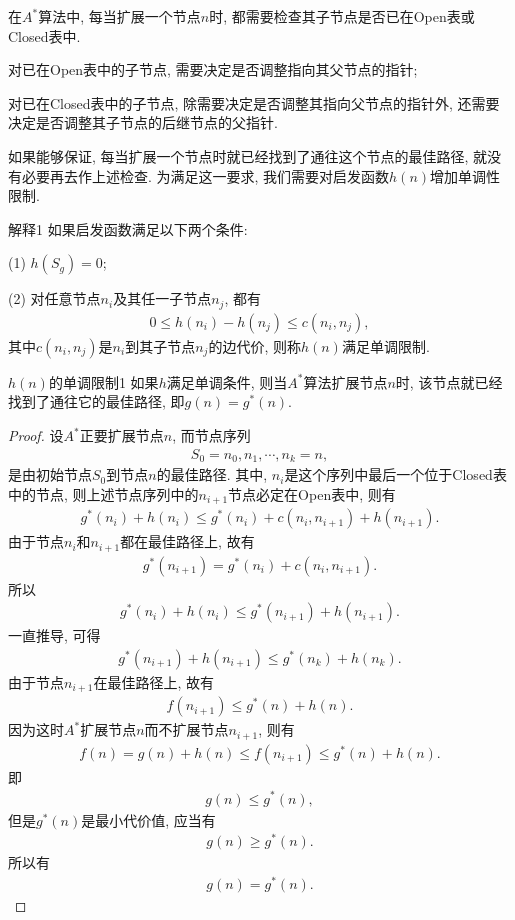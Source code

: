 在$A^*$算法中, 每当扩展一个节点$n$时, 都需要检查其子节点是否已在Open表或Closed表中.

对已在Open表中的子节点, 需要决定是否调整指向其父节点的指针;

对已在Closed表中的子节点, 除需要决定是否调整其指向父节点的指针外, 还需要决定是否调整其子节点的后继节点的父指针.

如果能够保证, 每当扩展一个节点时就已经找到了通往这个节点的最佳路径, 就没有必要再去作上述检查.
为满足这一要求, 我们需要对启发函数$h(n)$增加单调性限制.

\begin{mydef}{解释}{1}
如果启发函数满足以下两个条件:

(1) $h(S_g)=0$;

(2) 对任意节点$n_i$及其任一子节点$n_j$, 都有
\begin{align}
  0\leq h(n_i)-h(n_j)\leq c(n_i, n_j),
\end{align}
其中$c(n_i, n_j)$是$n_i$到其子节点$n_j$的边代价, 则称$h(n)$满足单调限制.
\end{mydef}
\begin{mythm}{$h(n)$的单调限制}{1}
如果$h$满足单调条件, 则当$A^*$算法扩展节点$n$时, 该节点就已经找到了通往它的最佳路径, 即$g(n)=g^*(n)$.
\end{mythm}
\begin{proof}
设$A^*$正要扩展节点$n$, 而节点序列
\begin{align}
  S_0=n_0, n_1,\cdots,n_k=n,
\end{align}
是由初始节点$S_0$到节点$n$的最佳路径. 其中, $n_i$是这个序列中最后一个位于Closed表中的节点, 则上述节点序列中的$n_{i+1}$节点必定在Open表中, 则有
\begin{align}
  g^*(n_i)+h(n_i)\leq g^*(n_i) +c(n_i, n_{i+1}) +h(n_{i+1}).
\end{align}
由于节点$n_i$和$n_{i+1}$都在最佳路径上, 故有
\begin{align}
  g^*( n_{i+1} )=g^*(n_i )+c(n_i, n_{i+1}).
\end{align}
所以
\begin{align}
g^*(n_i )+h(n_i )\leq g^*( n_{i+1}) +h(n_{i+1}).
\end{align}
一直推导, 可得
\begin{align}
  g^*( n_{i+1} )+h(n_{i+1})\leq g^*( n_k) +h(n_k).
\end{align}
由于节点$n_{i+1}$在最佳路径上, 故有
\begin{align}
  f( n_{i+1} )\leq g^*(n) +h(n).
\end{align}
因为这时$A^*$扩展节点$n$而不扩展节点$n_{i+1}$, 则有
\begin{align}
  f(n)=g(n)+h(n)\leq f( n_{i+1} )\leq g^*(n)+h(n).
\end{align}
即
\begin{align}
  g(n)\leq g^*(n),
\end{align}
但是$g^*(n)$是最小代价值, 应当有
\begin{align}
  g(n)\geq g^*(n).
\end{align}
所以有
\begin{align}
  g(n)=g^*(n).
\end{align}
\end{proof}
